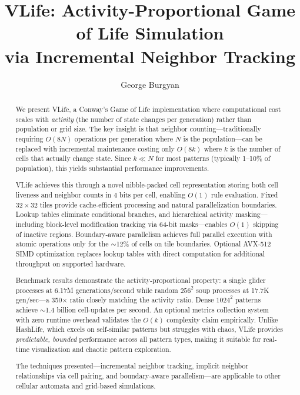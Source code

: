\documentclass[11pt]{article}
\title{\textbf{VLife: Activity-Proportional Game of Life Simulation\\via Incremental Neighbor Tracking}}
\author{George Burgyan}
\date{}
\theoremstyle{definition}
\begin{document}
    \maketitle

    \begin{abstract}
        We present VLife, a Conway's Game of Life implementation where computational cost scales with \emph{activity} (the number of state changes per generation) rather than population or grid size. The key insight is that neighbor counting---traditionally requiring $O(8N)$ operations per generation where $N$ is the population---can be replaced with incremental maintenance costing only $O(8k)$ where $k$ is the number of cells that actually change state. Since $k \ll N$ for most patterns (typically 1--10\% of population), this yields substantial performance improvements.

        VLife achieves this through a novel nibble-packed cell representation storing both cell liveness and neighbor counts in 4 bits per cell, enabling $O(1)$ rule evaluation. Fixed $32 \times 32$ tiles provide cache-efficient processing and natural parallelization boundaries. Lookup tables eliminate conditional branches, and hierarchical activity masking---including block-level modification tracking via 64-bit masks---enables $O(1)$ skipping of inactive regions. Boundary-aware parallelism achieves full parallel execution with atomic operations only for the $\sim$12\% of cells on tile boundaries. Optional AVX-512 SIMD optimization replaces lookup tables with direct computation for additional throughput on supported hardware.

        Benchmark results demonstrate the activity-proportional property: a single glider processes at 6.17M generations/second while random $256^2$ soup processes at 17.7K gen/sec---a 350$\times$ ratio closely matching the activity ratio. Dense $1024^2$ patterns achieve $\sim$1.4 billion cell-updates per second. An optional metrics collection system with zero runtime overhead validates the $O(k)$ complexity claim empirically. Unlike HashLife, which excels on self-similar patterns but struggles with chaos, VLife provides \emph{predictable, bounded} performance across all pattern types, making it suitable for real-time visualization and chaotic pattern exploration.

        The techniques presented---incremental neighbor tracking, implicit neighbor relationships via cell pairing, and boundary-aware parallelism---are applicable to other cellular automata and grid-based simulations.
    \end{abstract}
\end{document}

